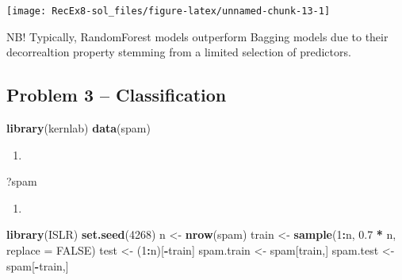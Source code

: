 \documentclass[
]{article}
\newenvironment{Shaded}{\begin{snugshade}}{\end{snugshade}}
\newcommand{\AttributeTok}[1]{\textcolor[rgb]{0.13,0.29,0.53}{#1}}
\newcommand{\ConstantTok}[1]{\textcolor[rgb]{0.56,0.35,0.01}{#1}}
\newcommand{\DecValTok}[1]{\textcolor[rgb]{0.00,0.00,0.81}{#1}}
\newcommand{\FloatTok}[1]{\textcolor[rgb]{0.00,0.00,0.81}{#1}}
\newcommand{\FunctionTok}[1]{\textcolor[rgb]{0.13,0.29,0.53}{\textbf{#1}}}
\newcommand{\NormalTok}[1]{#1}
\newcommand{\OtherTok}[1]{\textcolor[rgb]{0.56,0.35,0.01}{#1}}
\newcommand{\SpecialCharTok}[1]{\textcolor[rgb]{0.81,0.36,0.00}{\textbf{#1}}}
\providecommand{\tightlist}{%
  \setlength{\itemsep}{0pt}\setlength{\parskip}{0pt}}
\begin{document}
\texttt{[image: RecEx8-sol\_files/figure-latex/unnamed-chunk-13-1]}

NB! Typically, RandomForest models outperform Bagging models due to
their decorrealtion property stemming from a limited selection of
predictors.

\subsection{Problem 3 -- Classification}\label{problem-3-classification}

\begin{Shaded}
\begin{Highlighting}[]
\FunctionTok{library}\NormalTok{(kernlab)}
\FunctionTok{data}\NormalTok{(spam)}
\end{Highlighting}
\end{Shaded}

\begin{enumerate}
\def\labelenumi{\alph{enumi})}
\tightlist
\item
\end{enumerate}

\begin{Shaded}
\begin{Highlighting}[]
\NormalTok{?spam}
\end{Highlighting}
\end{Shaded}

\begin{enumerate}
\def\labelenumi{\alph{enumi})}
\setcounter{enumi}{1}
\tightlist
\item
\end{enumerate}

\begin{Shaded}
\begin{Highlighting}[]
\FunctionTok{library}\NormalTok{(ISLR)}
\FunctionTok{set.seed}\NormalTok{(}\DecValTok{4268}\NormalTok{)}
\NormalTok{n }\OtherTok{\textless{}{-}} \FunctionTok{nrow}\NormalTok{(spam)}
\NormalTok{train }\OtherTok{\textless{}{-}} \FunctionTok{sample}\NormalTok{(}\DecValTok{1}\SpecialCharTok{:}\NormalTok{n, }\FloatTok{0.7} \SpecialCharTok{*}\NormalTok{ n, }\AttributeTok{replace =} \ConstantTok{FALSE}\NormalTok{)}
\NormalTok{test }\OtherTok{\textless{}{-}}\NormalTok{ (}\DecValTok{1}\SpecialCharTok{:}\NormalTok{n)[}\SpecialCharTok{{-}}\NormalTok{train]}
\NormalTok{spam.train }\OtherTok{\textless{}{-}}\NormalTok{ spam[train,]}
\NormalTok{spam.test }\OtherTok{\textless{}{-}}\NormalTok{ spam[}\SpecialCharTok{{-}}\NormalTok{train,]}
\end{Highlighting}
\end{Shaded}
\end{document}
